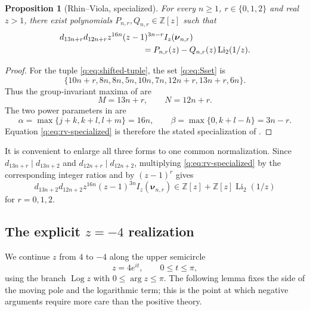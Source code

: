 \documentclass[11pt]{amsart}
\newcommand{\Li}{\operatorname{Li}}
\newcommand{\Log}{\operatorname{Log}}
\newcommand{\Z}{\mathbb Z}
\theoremstyle{plain}
\newtheorem{proposition}[theorem]{Proposition}
\theoremstyle{remark}\newtheorem{remark}[theorem]{Remark}
\numberwithin{equation}{section}
\begin{document}
\begin{proposition}[Rhin--Viola, specialized]\label{q:prop:rv-specialized}
For every $n\ge1$, $r\in\{0,1,2\}$ and real $z>1$, there exist polynomials
$P_{n,r},Q_{n,r}\in\Z[z]$ such that
\begin{equation}\label{q:eq:rv-specialized}
 \begin{aligned}
 &d_{13n+r}d_{12n+r}z^{16n}(z-1)^{3n-r}
 I_z(\boldsymbol\nu_{n,r})\\
 &\hspace{35mm}=P_{n,r}(z)-Q_{n,r}(z)\Li_2(1/z).
 \end{aligned}
\end{equation}
\end{proposition}

\begin{proof}
For the tuple \eqref{q:eq:shifted-tuple}, the set \eqref{q:eq:Sset} is
\[
 \{10n+r,8n,8n,5n,10n,7n,12n+r,13n+r,6n\}.
\]
Thus the group-invariant maxima of \cite[(4.1)--(4.2)]{RV05} are
\[
 M=13n+r,\qquad N=12n+r.
\]
The two power parameters in \cite[(2.9)]{RV05} are
\[
 \alpha=\max\{j+k,k+l,l+m\}=16n,
 \qquad
 \beta=\max\{0,k+l-h\}=3n-r.
\]
Equation \eqref{q:eq:rv-specialized} is therefore the stated specialization of
\cite[Theorem 2.1 and \S4]{RV05}.
\end{proof}

It is convenient to enlarge all three forms to one common normalization.
Since $d_{13n+r}\mid d_{13n+2}$ and $d_{12n+r}\mid d_{12n+2}$, multiplying
\eqref{q:eq:rv-specialized} by the corresponding integer ratios and by
$(z-1)^r$ gives
\begin{equation}\label{q:eq:common-rv}
 d_{13n+2}d_{12n+2}z^{16n}(z-1)^{3n}
 I_z(\boldsymbol\nu_{n,r})
 \in \Z[z]+\Z[z]\Li_2(1/z)
\end{equation}
for $r=0,1,2$.

\subsection{The explicit $z=-4$ realization}\label{q:sec:continuation}

We continue $z$ from $4$ to $-4$ along the upper semicircle
\begin{equation}\label{q:eq:zpath}
  z=4e^{it},\qquad 0\le t\le\pi,
\end{equation}
using the branch $\Log z$ with $0\le\arg z\le\pi$.  The following lemma fixes
the side of the moving pole and the logarithmic term; this is the point at
which negative arguments require more care than the positive theory.
\end{document}
